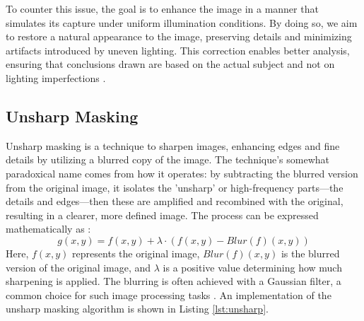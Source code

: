 \documentclass[sigconf]{acmart}
\begin{document}
To counter this issue, the goal is to enhance the image in a manner that simulates its capture under uniform illumination conditions. By doing so, we aim to restore a natural appearance to the image, preserving details and minimizing artifacts introduced by uneven lighting. This correction enables better analysis, ensuring that conclusions drawn are based on the actual subject and not on lighting imperfections \cite{dey2019uneven}.

\subsection{Unsharp Masking}\label{sec:unsharp}
Unsharp masking is a technique to sharpen images, enhancing edges and fine details by utilizing a blurred copy of the image. The technique's somewhat paradoxical name comes from how it operates: by subtracting the blurred version from the original image, it isolates the 'unsharp' or high-frequency parts—the details and edges—then these are amplified and recombined with the original, resulting in a clearer, more defined image. The process can be expressed mathematically as \cite{shi2021unsharp,morishita1988unsharp,deng2010generalized}:
\begin{equation}
g(x,y) = f(x,y) + \lambda \cdot (f(x,y) - Blur(f)(x,y))
\end{equation}
Here, $f(x,y)$ represents the original image, $Blur(f)(x,y)$ is the blurred version of the original image, and $\lambda$ is a positive value determining how much sharpening is applied. The blurring is often achieved with a Gaussian filter, a common choice for such image processing tasks \cite{shi2021unsharp,morishita1988unsharp,deng2010generalized}. An implementation of the unsharp masking algorithm is shown in Listing \ref{lst:unsharp}.
\end{document}
